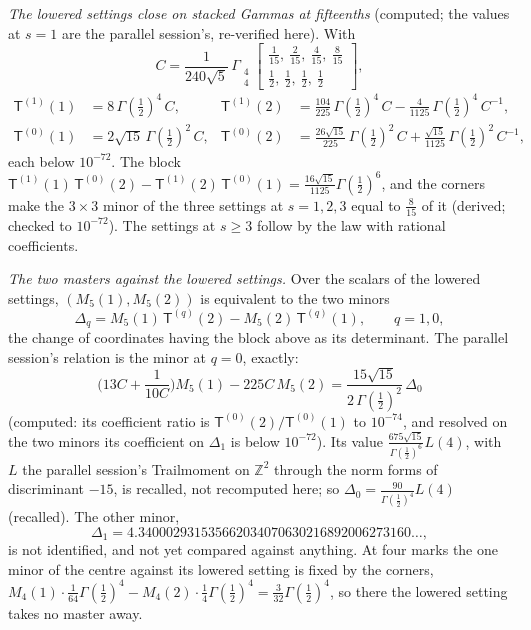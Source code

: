 \documentclass[11pt]{article}
\newcommand{\sT}{\mathsf T}
\newcommand{\Gst}[4]{\Gamma_{\substack{#1\\#2}}\!\begin{bmatrix}#3\\#4\end{bmatrix}}
\theoremstyle{plain}
\theoremstyle{remark}
\begin{document}
\emph{The lowered settings close on stacked Gammas at fifteenths} (computed; the values at $s=1$ are the parallel session's, re-verified here). With
\[
C=\frac1{240\sqrt5}\,\Gst44{\frac1{15},\ \frac2{15},\ \frac4{15},\ \frac8{15}}{\frac12,\ \frac12,\ \frac12,\ \frac12},
\]
\begin{align*}
\sT^{(1)}(1)&=8\,\Gamma(\tfrac12)^4\,C, & \sT^{(1)}(2)&=\tfrac{104}{225}\,\Gamma(\tfrac12)^4\,C-\tfrac4{1125}\,\Gamma(\tfrac12)^4\,C^{-1},\\
\sT^{(0)}(1)&=2\sqrt{15}\,\Gamma(\tfrac12)^2\,C, & \sT^{(0)}(2)&=\tfrac{26\sqrt{15}}{225}\,\Gamma(\tfrac12)^2\,C+\tfrac{\sqrt{15}}{1125}\,\Gamma(\tfrac12)^2\,C^{-1},
\end{align*}
each below $10^{-72}$. The block $\sT^{(1)}(1)\,\sT^{(0)}(2)-\sT^{(1)}(2)\,\sT^{(0)}(1)=\frac{16\sqrt{15}}{1125}\Gamma(\frac12)^6$, and the corners make the $3\times3$ minor of the three settings at $s=1,2,3$ equal to $\frac8{15}$ of it (derived; checked to $10^{-72}$). The settings at $s\ge3$ follow by the law with rational coefficients.

\emph{The two masters against the lowered settings.} Over the scalars of the lowered settings, $(M_5(1),M_5(2))$ is equivalent to the two minors
\[
\Delta_q=M_5(1)\,\sT^{(q)}(2)-M_5(2)\,\sT^{(q)}(1),\qquad q=1,0,
\]
the change of coordinates having the block above as its determinant. The parallel session's relation is the minor at $q=0$, exactly:
\[
\Big(13C+\frac1{10C}\Big)M_5(1)-225C\,M_5(2)=\frac{15\sqrt{15}}{2\,\Gamma(\frac12)^2}\,\Delta_0
\]
(computed: its coefficient ratio is $\sT^{(0)}(2)/\sT^{(0)}(1)$ to $10^{-74}$, and resolved on the two minors its coefficient on $\Delta_1$ is below $10^{-72}$). Its value $\frac{675\sqrt{15}}{\Gamma(\frac12)^6}L(4)$, with $L$ the parallel session's Trailmoment on $\mathbb Z^2$ through the norm forms of discriminant $-15$, is recalled, not recomputed here; so $\Delta_0=\frac{90}{\Gamma(\frac12)^4}L(4)$ (recalled). The other minor,
\[
\Delta_1=4.340002931535662034070630216892006273160\ldots,
\]
is not identified, and not yet compared against anything. At four marks the one minor of the centre against its lowered setting is fixed by the corners, $M_4(1)\cdot\frac1{64}\Gamma(\frac12)^4-M_4(2)\cdot\frac14\Gamma(\frac12)^4=\frac3{32}\Gamma(\frac12)^4$, so there the lowered setting takes no master away.
\end{document}
